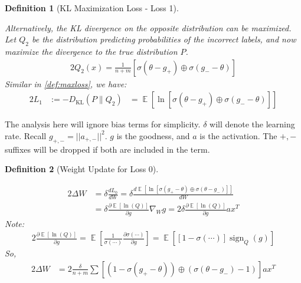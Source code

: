 \documentclass[12pt]{iopart}
\theoremstyle{break}
\newtheorem{prop}{Definition}[section]
\DeclareMathOperator{\E}{\mathbb{E}}
\DeclareMathOperator{\sign}{sign}
\begin{document}
\begin{prop}[KL Maximization Loss - Loss 1]
\label{def:minloss}
\begin{description}\item
Alternatively, the KL divergence on the opposite distribution can be maximized.\\
Let $Q_2$ be the distribution predicting probabilities of the incorrect labels, and now maximize the divergence to the true distribution $P$.
\begin{alignat}{2}Q_2(x) = \frac{1}{n+m}[\sigma(\theta-g_+)\oplus\sigma(g_--\theta)]\end{alignat}
Similar in \ref{def:maxloss}, we have:
\begin{alignat}{2}L_1 &:= -D_\text{KL}(P \parallel Q_2) &= \E[\ln[\sigma(\theta-g_+)\oplus\sigma(g_--\theta)]]
\end{alignat}
\end{description}
\end{prop}
The analysis here will ignore bias terms for simplicity. $\delta$ will denote the learning rate.
Recall $g_{+,-} = ||a_{+,-}||^2$. $g$ is the goodness, and $a$ is the activation. The $+,-$ suffixes will be dropped if both are included in the term.
\begin{prop}[Weight Update for Loss 0]
\label{def:maxgrad}
\begin{description}\item
\begin{alignat}{2}
\Delta W &= \delta \frac{dL_0}{dW}= \delta  \frac{d\E[\ln[\sigma(g_+-\theta)\oplus\sigma(\theta-g_-)]]}{dW} \\
&= \delta  \frac{\partial \E[\ln(Q)]}{\partial g} \nabla_W g = 2 \delta  \frac{\partial \E[\ln(Q)]}{\partial g} a x^T
\end{alignat}
Note:
\begin{alignat}{2}
\frac{\partial \E[\ln(Q)]}{\partial g}= \E[\frac{1}{\sigma(\cdots)} \frac{\partial \sigma(\cdots)}{\partial g}] = \E[[1 - \sigma(\cdots)] \sign_Q(g)]
\end{alignat}
So,
\begin{alignat}{2}
\Delta W &= 2 \frac{\delta}{n+m}\sum[(1 - \sigma(g_+ - \theta))\oplus(\sigma(\theta-g_-) - 1)] a x^T
\end{alignat}
\end{description}
\end{prop}
\end{document}
